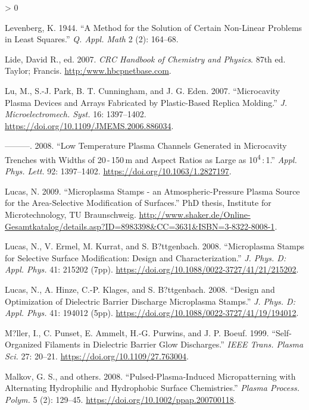 \documentclass[
  10pt,
  twoside]{article}
\newlength{\cslhangindent}
\newenvironment{CSLReferences}[2] %
 {%
  \setlength{\parindent}{0pt}
  \ifodd #1 \everypar{\setlength{\hangindent}{\cslhangindent}}\ignorespaces\fi
  \ifnum #2 > 0
  \setlength{\parskip}{#2\baselineskip}
  \fi
 }%
 {}
\begin{document}
\begin{CSLReferences}{1}{0}
\leavevmode\hypertarget{ref-Leve1944}{}%
Levenberg, K. 1944. {``A Method for the Solution of Certain Non-Linear Problems in Least Squares.''} \emph{Q. Appl. Math} 2 (2): 164--68.

\leavevmode\hypertarget{ref-CRC07}{}%
Lide, David R., ed. 2007. \emph{CRC Handbook of Chemistry and Physics}. 87th ed. Taylor; Francis. \href{https://http:/www.hbcpnetbase.com}{http:/www.hbcpnetbase.com}.

\leavevmode\hypertarget{ref-Lu07}{}%
Lu, M., S.-J. Park, B. T. Cunningham, and J. G. Eden. 2007. {``Microcavity Plasma Devices and Arrays Fabricated by Plastic-Based Replica Molding.''} \emph{J. Microelectromech. Syst.} 16: 1397--1402. \url{https://doi.org/10.1109/JMEMS.2006.886034}.

\leavevmode\hypertarget{ref-Lu08}{}%
---------. 2008. {``Low Temperature Plasma Channels Generated in Microcavity Trenches with Widths of 20 - 150 {}m and Aspect Ratios as Large as 10\textsuperscript{4} : 1.''} \emph{Appl. Phys. Lett.} 92: 1397--1402. \url{https://doi.org/10.1063/1.2827197}.

\leavevmode\hypertarget{ref-Luca09}{}%
Lucas, N. 2009. {``Microplasma Stamps - an Atmospheric-Pressure Plasma Source for the Area-Selective Modification of Surfaces.''} PhD thesis, Institute for Microtechnology, TU Braunschweig. \url{http://www.shaker.de/Online-Gesamtkatalog/details.asp?ID=8983398\&CC=3631\&ISBN=3-8322-8008-1}.

\leavevmode\hypertarget{ref-Luca08-2}{}%
Lucas, N., V. Ermel, M. Kurrat, and S. B?ttgenbach. 2008. {``Microplasma Stamps for Selective Surface Modification: Design and Characterization.''} \emph{J. Phys. D: Appl. Phys.} 41: 215202 (7pp). \url{https://doi.org/10.1088/0022-3727/41/21/215202}.

\leavevmode\hypertarget{ref-Luca08-1}{}%
Lucas, N., A. Hinze, C.-P. Klages, and S. B?ttgenbach. 2008. {``Design and Optimization of Dielectric Barrier Discharge Microplasma Stamps.''} \emph{J. Phys. D: Appl. Phys.} 41: 194012 (5pp). \url{https://doi.org/10.1088/0022-3727/41/19/194012}.

\leavevmode\hypertarget{ref-Muel1999}{}%
M?ller, I., C. Punset, E. Ammelt, H.-G. Purwins, and J. P. Boeuf. 1999. {``Self-Organized Filaments in Dielectric Barrier Glow Discharges.''} \emph{IEEE Trans. Plasma Sci.} 27: 20--21. \url{https://doi.org/10.1109/27.763004}.

\leavevmode\hypertarget{ref-Malk08}{}%
Malkov, G. S., and others. 2008. {``Pulsed-Plasma-Induced Micropatterning with Alternating Hydrophilic and Hydrophobic Surface Chemistries.''} \emph{Plasma Process. Polym.} 5 (2): 129--45. \url{https://doi.org/10.1002/ppap.200700118}.


\end{CSLReferences}
\end{document}
